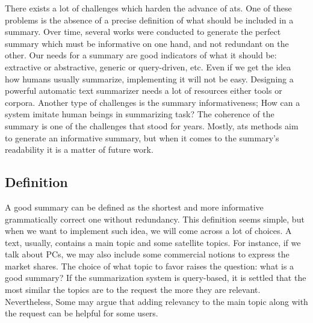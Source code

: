 There exists a lot of challenges which harden the advance of \ac{ats}. 
One of these problems is the absence of a precise definition of what should be included in a summary. 
Over time, several works were conducted to generate the perfect summary which must be informative on one hand, and not redundant on the other. 
Our needs for a summary are good indicators of what it should be: extractive or abstractive, generic or query-driven, etc. 
Even if we get the idea how humans usually summarize, implementing it will not be easy. 
Designing a powerful automatic text summarizer needs a lot of resources either tools or corpora. 
Another type of challenges is the summary informativeness; How can a system imitate human beings in summarizing task?
The coherence of the summary is one of the challenges that stood for years. 
Mostly, \ac{ats} methods aim to generate an informative summary, but when it comes to the summary's readability it is a matter of future work.  

\subsection{Definition}

A good summary can be defined as the shortest and more informative grammatically correct one without redundancy. 
This definition seems simple, but when we want to implement such idea, we will come across a lot of choices. 
A text, usually, contains a main topic and some satellite topics. 
For instance, if we talk about PCs, we may also include some commercial notions to express the market shares.
The choice of what topic to favor raises the question: what is a good summary?
If the summarization system is query-based, it is settled that the most similar the topics are to the request the more they are relevant. 
Nevertheless, Some may argue that adding relevancy to the main topic along with the request can be helpful for some users.

